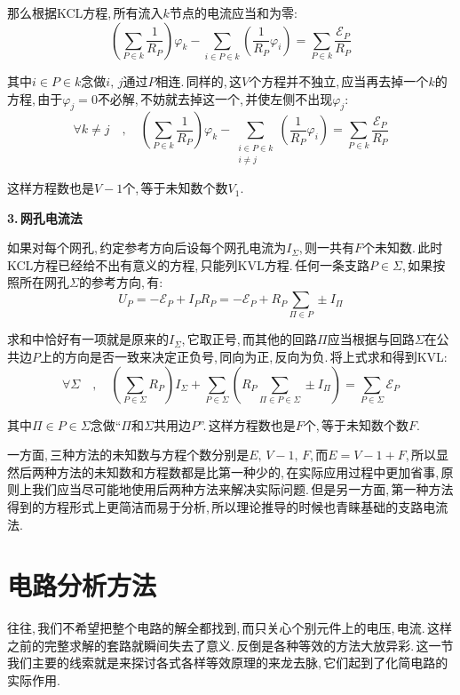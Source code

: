 那么根据KCL方程,\,所有流入$k$节点的电流应当和为零:
\[\left(\sum_{P\in k}\frac{1}{R_P}\right)\varphi_k-\sum_{i\in P\in k}\left(\frac{1}{R_P}\varphi_i\right)=\sum_{P\in k}\frac{\mathscr{E}_P}{R_P}\]

其中$i\in P\in k$念做$i,\,j$通过$P$相连.\,同样的,\,这$V$个方程并不独立,\,应当再去掉一个$k$的方程,\,由于$\varphi_j=0$不必解,\,不妨就去掉这一个,\,并使左侧不出现$\varphi_j$:
\[\forall k\neq j\quad ,\quad \left(\sum_{P\in k}\frac{1}{R_P}\right)\varphi_k-\sum_{\substack{i\in P\in k\\ i\neq j}}\left(\frac{1}{R_P}\varphi_i\right)=\sum_{P\in k}\frac{\mathscr{E}_P}{R_P}\]

这样方程数也是$V-1$个,\,等于未知数个数$V_1$.

\vspace{0.2cm}
\textbf{3.\,网孔电流法}
\vspace{0.2cm}

如果对每个网孔,\,约定参考方向后设每个网孔电流为$I_\Sigma$,\,则一共有$F$个未知数.\,此时KCL方程已经给不出有意义的方程,\,只能列KVL方程.\,任何一条支路$P\in \Sigma$,\,如果按照所在网孔$\Sigma$的参考方向,\,有:
\[U_P=-\mathscr{E}_P+I_PR_P=-\mathscr{E}_P+R_P\sum_{\Pi \in P}\pm I_\Pi\]

求和中恰好有一项就是原来的$I_\Sigma$,\,它取正号,\,而其他的回路$\Pi$应当根据与回路$\Sigma$在公共边$P$上的方向是否一致来决定正负号,\,同向为正,\,反向为负.\,将上式求和得到KVL:
\[\forall \Sigma\quad ,\quad \left(\sum_{P\in\Sigma}R_P\right)I_\Sigma+\sum_{P\in\Sigma}\left(R_P\sum_{\Pi \in P\in \Sigma}\pm I_\Pi\right)=\sum_{P\in\Sigma}\mathscr{E}_P \]

其中$\Pi \in P\in \Sigma$念做``$\Pi$和$\Sigma$共用边$P$''.\,这样方程数也是$F$个,\,等于未知数个数$F$.

\vspace{0.5cm}

一方面,\,三种方法的未知数与方程个数分别是$E,\,V-1,\,F$,\,而$E=V-1+F$,\,所以显然后两种方法的未知数和方程数都是比第一种少的,\,在实际应用过程中更加省事,\,原则上我们应当尽可能地使用后两种方法来解决实际问题.\,但是另一方面,\,第一种方法得到的方程形式上更简洁而易于分析,\,所以理论推导的时候也青睐基础的支路电流法.

\section{电路分析方法}

往往,\,我们不希望把整个电路的解全都找到,\,而只关心个别元件上的电压,\,电流.\,这样之前的完整求解的套路就瞬间失去了意义.\,反倒是各种等效的方法大放异彩.\,这一节我们主要的线索就是来探讨各式各样等效原理的来龙去脉,\,它们起到了化简电路的实际作用.

